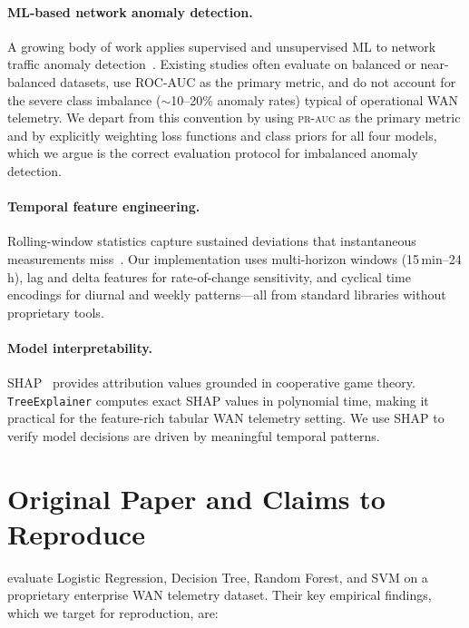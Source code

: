 \documentclass{article}
\newcommand{\prauc}{\textsc{pr-auc}\xspace}
\begin{document}
\paragraph{ML-based network anomaly detection.}
A growing body of work applies supervised and unsupervised ML to network traffic
anomaly detection~\citep{schummer2024}.
Existing studies often evaluate on balanced or near-balanced datasets, use
ROC-AUC as the primary metric, and do not account for the severe class imbalance
($\sim$10--20\% anomaly rates) typical of operational WAN telemetry.
We depart from this convention by using \prauc as the primary metric and by
explicitly weighting loss functions and class priors for all four models, which
we argue is the correct evaluation protocol for imbalanced anomaly detection.

\paragraph{Temporal feature engineering.}
Rolling-window statistics capture sustained deviations that instantaneous
measurements miss~\citep{schummer2024}.
Our implementation uses multi-horizon windows (15\,min--24\,h), lag and delta
features for rate-of-change sensitivity, and cyclical time encodings for diurnal
and weekly patterns---all from standard libraries without proprietary tools.

\paragraph{Model interpretability.}
SHAP~\citep{lundberg2017} provides attribution values grounded in cooperative
game theory. \texttt{TreeExplainer} computes exact SHAP values in polynomial
time, making it practical for the feature-rich tabular WAN telemetry setting.
We use SHAP to verify model decisions are driven by meaningful temporal patterns.

\section{Original Paper and Claims to Reproduce}
\label{sec:claims}

\citet{schummer2024} evaluate Logistic Regression,
Decision Tree, Random Forest, and SVM on a proprietary enterprise WAN telemetry
dataset.
Their key empirical findings, which we target for reproduction, are:
\end{document}
